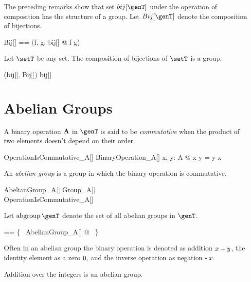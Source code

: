 \documentclass{amsart}
\begin{document}
The preceding remarks show that set $bij[\genT]$ under the operation of composition has the structure of a group.
Let $Bij[\genT]$ denote the composition of bijections.
\begin{zed}
	Bij[\genT] == (\lambda f, g: bij[\genT] @ f \circ g)
\end{zed}

\begin{example}
Let $\setT$ be any set.
The composition of bijections of $\setT$ is a group.

\begin{zed}
(bij[\setT], Bij[\setT]) \in \group bij[\setT]
\end{zed}

\end{example}

\section{Abelian Groups}

A binary operation $\mathbf{A}$ in $\genT$ is said to be {\em commutative} when the product of two elements doesn't depend on 
their order.
\begin{schema}{OperationIsCommutative\_A}[\genT]
	BinaryOperation\_A[\genT]
\where
	\forall x, y: A @ x \mulA y = y \mulA x
\end{schema}

An {\em abelian group} is a group in which the binary operation is commutative.
\begin{schema}{AbelianGroup\_A}[\genT]
	Group\_A[\genT] \\
	OperationIsCommutative\_A[\genT]
\end{schema}

Let $\abgroup \genT$ denote the set of all abelian groups in $\genT$.
\begin{zed}
	\abgroup \genT == \{~ AbelianGroup\_A[\genT] @ \strucA ~\}
\end{zed}

Often in an abelian group the binary operation is denoted as addition $x \mathbin{+} y$,
the identity element as a zero $0$, and the inverse operation as negation $\operatorname{-} x$.

\begin{example}
Addition over the integers is an abelian group.

\begin{zed}
	(\num, (\_ + \_)) \in \abgroup \num
\end{zed}

\end{example}

\printbibliography
\end{document}
